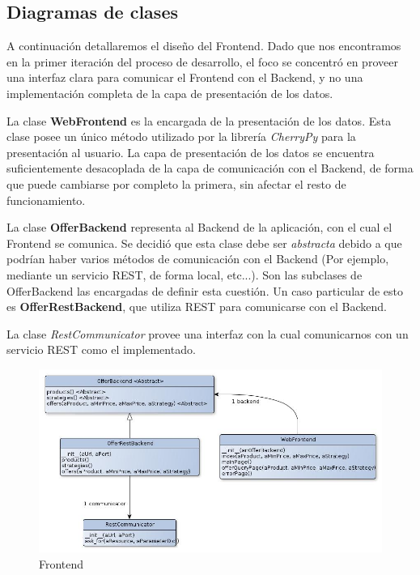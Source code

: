 \documentclass[10pt, a4paper]{article}
\begin{document}
\subsection{Diagramas de clases}
  
A continuación detallaremos el diseño del Frontend. Dado que nos encontramos en la primer iteración del proceso de desarrollo, el foco se concentró en proveer una interfaz clara para comunicar el Frontend con el Backend, y no una implementación completa de la capa de presentación de los datos.

La clase \textbf{WebFrontend} es la encargada de la presentación de los datos. Esta clase posee un único método utilizado por la librería \emph{CherryPy} para la presentación al usuario. La capa de presentación de los datos se encuentra suficientemente desacoplada de la capa de comunicación con el Backend, de forma que puede cambiarse por completo la primera, sin afectar el resto de funcionamiento.

La clase \textbf{OfferBackend} representa al Backend de la aplicación, con el cual el Frontend se comunica. Se decidió que esta clase debe ser \emph{abstracta} debido a que podrían haber varios métodos de comunicación con el Backend (Por ejemplo, mediante un servicio REST, de forma local, etc...). Son las subclases de OfferBackend las encargadas de definir esta cuestión. Un caso particular de esto es \textbf{OfferRestBackend}, que utiliza REST para comunicarse con el Backend. 

La clase \emph{RestCommunicator} provee una interfaz con la cual comunicarnos con un servicio REST como el implementado. 

\begin{figure}[H]
\centering
\includegraphics[scale=0.6]{graphics/frontend_class.jpg}
\caption{Frontend}
\end{figure}
\newpage
\end{document}
